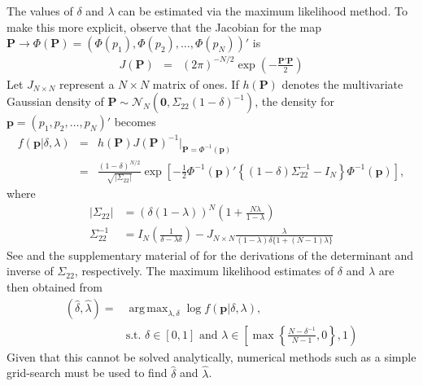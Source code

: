 \documentclass[11pt]{article}
\DeclareMathOperator*{\argmax}{arg\,max}
\theoremstyle{definition}
\theoremstyle{definition}
\begin{document}
The values of $\delta$ and $\lambda$ can be estimated via the maximum likelihood method. To make this more explicit, observe that the Jacobian for the map $\boldsymbol{P} \to \Phi\left(\boldsymbol{P}\right) = (\Phi(p_1), \Phi(p_2), \dots, \Phi(p_N))'$ is
\begin{eqnarray*}
J(\boldsymbol{P}) &=& (2\pi)^{-N/2} \exp \left( - \frac{\boldsymbol{P}' \boldsymbol{P}}{2}   \right) 
\end{eqnarray*}
%
Let $J_{N \times N}$ represent a $N\times N$ matrix of ones. If $h(\boldsymbol{P})$ denotes the multivariate Gaussian density of $\boldsymbol{P} \sim \mathcal{N}_N\left(\boldsymbol{0}, \Sigma_{22} (1-\delta)^{-1}\right)$,
the density for  $\boldsymbol{p} = (p_1, p_2, \dots, p_N)'$ becomes
\begin{eqnarray*}
 f\left(\boldsymbol{p} | \delta, \lambda \right) &=& h(\boldsymbol{P}) J(\boldsymbol{P})^{-1} \bigg|_{\boldsymbol{P} = \Phi^{-1}(\boldsymbol{p})}\\
&=& \frac{(1-\delta)^{N/2}}{\sqrt{ \left|\Sigma_{22}\right|}} \exp\left[ -\frac{1}{2} \Phi^{-1}(\boldsymbol{p})' \left\{ (1-\delta) \Sigma_{22}^{-1} - I_N \right\} \Phi^{-1}(\boldsymbol{p})  \right],
\end{eqnarray*}
where
\begin{align}
\left| \Sigma_{22}\right| &= (\delta(1- \lambda))^N \left(1+\frac{N \lambda}{1 - \lambda} \right) \nonumber\\
\Sigma_{22}^{-1} &= I_N \left(\frac{1}{\delta-\lambda\delta} \right) - J_{N \times N} \frac{\lambda}{(1-\lambda)\delta\{1+(N-1) \lambda\}} \label{inverse}
\end{align}
See \cite{rao2009linear} and the supplementary material of \cite{dobbin2005sample} for the derivations of the determinant and inverse of $\Sigma_{22}$, respectively. The maximum likelihood estimates of $\delta$ and $\lambda$ are then obtained from
\begin{align*}
\left(\hat{\delta}, \hat{\lambda}\right) =& \argmax_{\lambda, \delta} \log  f\left(\boldsymbol{p}| \delta, \lambda \right),\\
& \text{s.t. } \nonumber \delta \in [0,1] \text{ and } \lambda \in \left[  \max \left\{ \frac{N-\delta^{-1}}{N-1}, 0\right\}, 1 \right)
\end{align*}
Given that this cannot be solved analytically, numerical methods such as a simple grid-search must be used to find $\hat{\delta}$ and $\hat{\lambda}$. 


%
\end{document}
